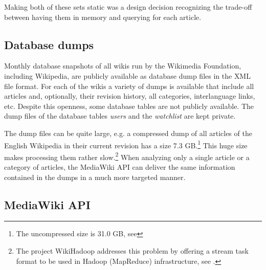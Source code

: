 Making both of these sets static was a design decision recognizing the trade-off between having them in memory and querying for each article.

\subsection{Database dumps}\label{sub:dumps}

Monthly database snapshots of all wikis run by the Wikimedia Foundation, including Wikipedia,  are publicly available as database dump files in the \ac{XML} file format.
For each of the wikis a variety of dumps is available that include all articles and, optionally, their revision history, all categories, interlanguage links, etc.
Despite this openness, some database tables are not publicly available.
The dump files of the database tables \emph{users} and the \emph{watchlist} are kept private.

The dump files can be quite large, e.g. a compressed dump of all articles of the English Wikipedia in their current revision has a size 7.3 GB.\footnote{The uncompressed size is 31.0 GB, see }
This huge size makes processing them rather slow.\footnote{The project WikiHadoop addresses this problem by offering a stream task format to be used in Hadoop (MapReduce) infrastructure, see .}
When analyzing only a single article or a category of articles, the MediaWiki \ac{API} can deliver the same information contained in the dumps in a much more targeted manner. 

\subsection{MediaWiki \ac{API}}\label{sub:mediawikiapi}

